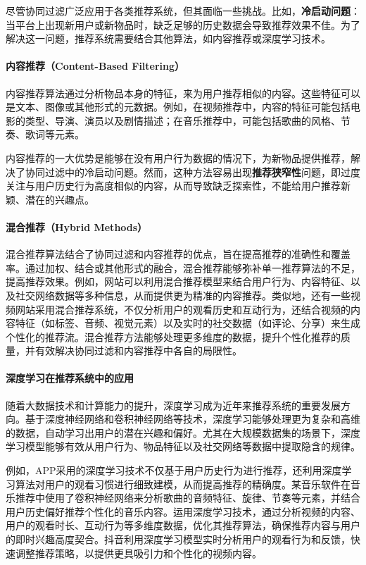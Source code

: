 尽管协同过滤广泛应用于各类推荐系统，但其面临一些挑战。比如，\textbf{冷启动问题}：当平台上出现新用户或新物品时，缺乏足够的历史数据会导致推荐效果不佳。为了解决这一问题，推荐系统需要结合其他算法，如内容推荐或深度学习技术。

\paragraph{内容推荐（Content-Based Filtering）}

内容推荐算法通过分析物品本身的特征，来为用户推荐相似的内容。这些特征可以是文本、图像或其他形式的元数据。例如，在视频推荐中，内容的特征可能包括电影的类型、导演、演员以及剧情描述；在音乐推荐中，可能包括歌曲的风格、节奏、歌词等元素。

内容推荐的一大优势是能够在没有用户行为数据的情况下，为新物品提供推荐，解决了协同过滤中的冷启动问题。然而，这种方法容易出现\textbf{推荐狭窄性}问题，即过度关注与用户历史行为高度相似的内容，从而导致缺乏探索性，不能给用户推荐新颖、潜在的兴趣点。

\paragraph{混合推荐（Hybrid Methods）}

混合推荐算法结合了协同过滤和内容推荐的优点，旨在提高推荐的准确性和覆盖率。通过加权、结合或其他形式的融合，混合推荐能够弥补单一推荐算法的不足，提高推荐效果。例如，网站可以利用混合推荐模型来结合用户行为、内容特征、以及社交网络数据等多种信息，从而提供更为精准的内容推荐。类似地，还有一些视频网站采用混合推荐系统，不仅分析用户的观看历史和互动行为，还结合视频的内容特征（如标签、音频、视觉元素）以及实时的社交数据（如评论、分享）来生成个性化的推荐流。混合推荐方法能够处理更多维度的数据，提升个性化推荐的质量，并有效解决协同过滤和内容推荐中各自的局限性。

\paragraph{深度学习在推荐系统中的应用}

随着大数据技术和计算能力的提升，深度学习成为近年来推荐系统的重要发展方向。基于深度神经网络和卷积神经网络等技术，深度学习能够处理更为复杂和高维的数据，自动学习出用户的潜在兴趣和偏好。尤其在大规模数据集的场景下，深度学习模型能够有效从用户行为、物品特征以及社交网络等数据中提取隐含的规律。

例如，APP采用的深度学习技术不仅基于用户历史行为进行推荐，还利用深度学习算法对用户的观看习惯进行细致建模，从而提高推荐的精确度。某音乐软件在音乐推荐中使用了卷积神经网络来分析歌曲的音频特征、旋律、节奏等元素，并结合用户历史偏好推荐个性化的音乐内容。运用深度学习技术，通过分析视频的内容、用户的观看时长、互动行为等多维度数据，优化其推荐算法，确保推荐内容与用户的即时兴趣高度契合。抖音利用深度学习模型实时分析用户的观看行为和反馈，快速调整推荐策略，以提供更具吸引力和个性化的视频内容。

